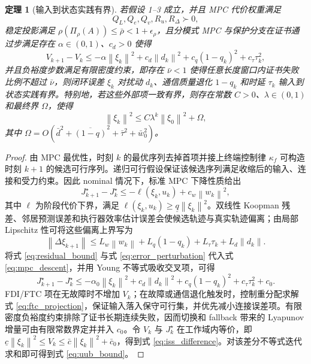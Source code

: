 \documentclass[twocolumn,3p,times,procedia]{elsarticle}
\newcommand{\norm}[1]{\left\lVert #1 \right\rVert}
\newtheorem{theorem}{定理}
\begin{document}
\begin{theorem}[输入到状态实践有界]
若假设 1--3 成立，并且 MPC 代价权重满足
\begin{equation}
Q_L,Q_e,Q_v,R_u,R_\Delta\succ0,
\label{eq:positive_weights}
\end{equation}
稳定投影满足 $\rho(\Pi_\rho(A))\le \bar\rho<1+\epsilon_\rho$，且分模式 MPC 与保护分支在证书通过步满足存在 $\alpha\in(0,1)$、$c_d>0$ 使得
\begin{equation}
V_{k+1}-V_k\le -\alpha\norm{\xi_k}^2+c_d\norm{d_k}^2+c_q(1-q_k)^2+c_\tau\tau_k^2,
\label{eq:iss_difference}
\end{equation}
并且负裕度步数满足有限密度约束，即存在 $\bar \nu<1$ 使得任意长度窗口内证书失败比例不超过 $\bar \nu$，则闭环误差 $\xi_k$ 对扰动 $d_k$、通信质量退化 $1-q_k$ 和时延 $\tau_k$ 输入到状态实践有界。特别地，若这些外部项一致有界，则存在常数 $C>0$、$\lambda\in(0,1)$ 和最终界 $\Omega$，使得
\begin{equation}
\norm{\xi_k}^2\le C\lambda^k\norm{\xi_0}^2+\Omega ,
\label{eq:uub_bound}
\end{equation}
其中 $\Omega=O(\bar d^2+\overline{(1-q)}^2+\bar\tau^2+\bar w_0^2)$。
\end{theorem}

\begin{proof}
由 MPC 最优性，时刻 $k$ 的最优序列去掉首项并接上终端控制律 $\kappa_f$ 可构造时刻 $k+1$ 的候选可行序列。递归可行假设保证该候选序列满足收缩后的输入、连接和受力约束。因此 nominal 情况下，标准 MPC 下降性质给出
\begin{equation}
J_{k+1}^\star-J_k^\star\le -\ell(\xi_k,u_k)+c_w\norm{w_k}^2 ,
\label{eq:mpc_descent}
\end{equation}
其中 $\ell$ 为阶段代价下界，满足 $\ell(\xi_k,u_k)\ge \underline q\norm{\xi_k}^2$。双线性 Koopman 残差、邻居预测误差和执行器效率估计误差会使候选轨迹与真实轨迹偏离；由局部 Lipschitz 性可将这些偏离上界写为
\begin{equation}
\norm{\Delta \xi_{k+1}}\le L_w\norm{w_k}+L_q(1-q_k)+L_\tau\tau_k+L_d\norm{d_k}.
\label{eq:error_perturbation}
\end{equation}
将式 \eqref{eq:residual_bound} 与式 \eqref{eq:error_perturbation} 代入式 \eqref{eq:mpc_descent}，并用 Young 不等式吸收交叉项，可得
\begin{equation}
J_{k+1}^\star-J_k^\star\le -\alpha_0\norm{\xi_k}^2+c_d\norm{d_k}^2+c_q(1-q_k)^2+c_\tau\tau_k^2+c_0 .
\label{eq:descent_with_disturbance}
\end{equation}
FDI/FTC 项在无故障时不增加 $V_k$；在故障或通信退化触发时，控制重分配求解式 \eqref{eq:ftc_projection}，保证输入落入保守可行集，并优先减小连接误差项。有限密度负裕度约束排除了证书长期连续失败，因而切换和 fallback 带来的 Lyapunov 增量可由有限常数界定并并入 $c_0$。令 $V_k$ 与 $J_k^\star$ 在工作域内等价，即 $\underline c\norm{\xi_k}^2\le V_k\le \bar c\norm{\xi_k}^2+\bar c_0$，得到式 \eqref{eq:iss_difference}。对该差分不等式迭代求和即可得到式 \eqref{eq:uub_bound}。
\end{proof}
\end{document}
